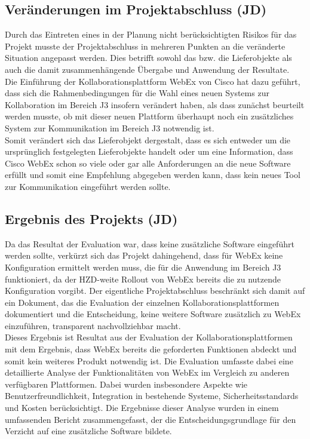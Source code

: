 \documentclass[ThesisDJ.tex]{subfiles}
\begin{document}
	\subsection{Veränderungen im Projektabschluss (JD)}
	Durch das Eintreten eines in der Planung nicht berücksichtigten Risikos für das Projekt musste der Projektabschluss in mehreren Punkten an die veränderte Situation angepasst werden. Dies betrifft sowohl das bzw. die Lieferobjekte als auch die damit zusammenhängende Übergabe und Anwendung der Resultate.\\
	Die Einführung der Kollaborationsplattform WebEx von Cisco hat dazu geführt, dass sich die Rahmenbedingungen für die Wahl eines neuen Systems zur Kollaboration im Bereich J3 insofern verändert haben, als dass zunächst beurteilt werden musste, ob mit dieser neuen Plattform überhaupt noch ein zusätzliches System zur Kommunikation im Bereich J3 notwendig ist. \\
	Somit verändert sich das Lieferobjekt dergestalt, dass es sich entweder um die ursprünglich festgelegten Lieferobjekte handelt oder um eine Information, dass Cisco WebEx schon so viele oder gar alle Anforderungen an die neue Software erfüllt und somit eine Empfehlung abgegeben werden kann, dass kein neues Tool zur Kommunikation eingeführt werden sollte.\\
	
	\subsection{Ergebnis des Projekts (JD)}
	Da das Resultat der Evaluation war, dass keine zusätzliche Software eingeführt werden sollte, verkürzt sich das Projekt dahingehend, dass für WebEx keine Konfiguration ermittelt werden muss, die für die Anwendung im Bereich J3 funktioniert, da der HZD-weite Rollout von WebEx bereits die zu nutzende Konfiguration vorgibt. Der eigentliche Projektabschluss beschränkt sich damit auf ein Dokument, das die Evaluation der einzelnen Kollaborationsplattformen dokumentiert und die Entscheidung, keine weitere Software zusätzlich zu WebEx einzuführen, transparent nachvollziehbar macht. \\
	Dieses Ergebnis ist Resultat aus der Evaluation der Kollaborationsplattformen mit dem Ergebnis, dass WebEx bereits die geforderten Funktionen abdeckt und somit kein weiteres Produkt notwendig ist. Die Evaluation umfasste dabei eine detaillierte Analyse der Funktionalitäten von WebEx im Vergleich zu anderen verfügbaren Plattformen. Dabei wurden insbesondere Aspekte wie Benutzerfreundlichkeit, Integration in bestehende Systeme, Sicherheitsstandards und Kosten berücksichtigt. Die Ergebnisse dieser Analyse wurden in einem umfassenden Bericht zusammengefasst, der die Entscheidungsgrundlage für den Verzicht auf eine zusätzliche Software bildete. \\
	
\end{document}
